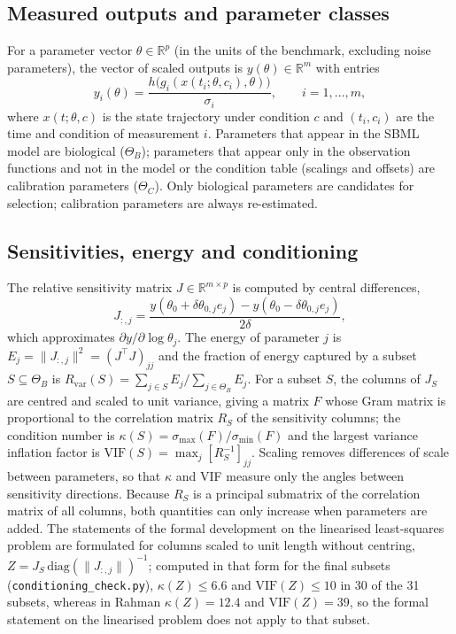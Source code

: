 \documentclass[pdflatex,sn-nature]{sn-jnl}
\theoremstyle{plain}
\begin{document}
\subsection*{Measured outputs and parameter classes}\label{met:outputs}

For a parameter vector $\theta\in\mathbb{R}^p$ (in the units of the benchmark, excluding noise parameters), the vector of scaled outputs is $y(\theta)\in\mathbb{R}^m$ with entries
\begin{equation}
y_i(\theta)=\frac{h\big(g_i(x(t_i;\theta,c_i),\theta)\big)}{\sigma_i},\qquad i=1,\dots,m,
\label{eq:outputs}
\end{equation}
where $x(t;\theta,c)$ is the state trajectory under condition $c$ and $(t_i,c_i)$ are the time and condition of measurement $i$. Parameters that appear in the SBML model are biological ($\Theta_B$); parameters that appear only in the observation functions and not in the model or the condition table (scalings and offsets) are calibration parameters ($\Theta_C$). Only biological parameters are candidates for selection; calibration parameters are always re-estimated.

\subsection*{Sensitivities, energy and conditioning}\label{met:sens}

The relative sensitivity matrix $J\in\mathbb{R}^{m\times p}$ is computed by central differences,
\begin{equation}
J_{:,j}=\frac{y(\theta_0+\delta\theta_{0,j}e_j)-y(\theta_0-\delta\theta_{0,j}e_j)}{2\delta},
\label{eq:jac}
\end{equation}
which approximates $\partial y/\partial\log\theta_j$. The energy of parameter $j$ is $E_j=\|J_{:,j}\|^2=(J^\top J)_{jj}$ and the fraction of energy captured by a subset $S\subseteq\Theta_B$ is $R_{\mathrm{var}}(S)=\sum_{j\in S}E_j/\sum_{j\in\Theta_B}E_j$. For a subset $S$, the columns of $J_S$ are centred and scaled to unit variance, giving a matrix $F$ whose Gram matrix is proportional to the correlation matrix $R_S$ of the sensitivity columns; the condition number is $\kappa(S)=\sigma_{\max}(F)/\sigma_{\min}(F)$ and the largest variance inflation factor is $\mathrm{VIF}(S)=\max_j[R_S^{-1}]_{jj}$\cite{bib5,bib9}. Scaling removes differences of scale between parameters, so that $\kappa$ and VIF measure only the angles between sensitivity directions. Because $R_S$ is a principal submatrix of the correlation matrix of all columns, both quantities can only increase when parameters are added. The statements of the formal development on the linearised least-squares problem are formulated for columns scaled to unit length without centring, $Z=J_S\,\mathrm{diag}(\|J_{:,j}\|)^{-1}$; computed in that form for the final subsets (\texttt{conditioning\_check.py}), $\kappa(Z)\le6.6$ and $\mathrm{VIF}(Z)\le10$ in 30 of the 31 subsets, whereas in Rahman $\kappa(Z)=12.4$ and $\mathrm{VIF}(Z)=39$, so the formal statement on the linearised problem does not apply to that subset.
\end{document}
